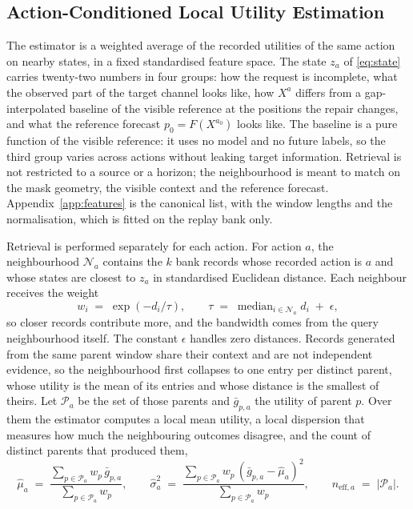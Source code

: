 \documentclass{article}
\newcommand{\calN}{\mathcal{N}}
\newcommand{\calP}{\mathcal{P}}
\begin{document}
\subsection{Action-Conditioned Local Utility Estimation}
\label{sec:method-scoring}
The estimator is a weighted average of the recorded utilities of the same action on nearby
states, in a fixed standardised feature space. The state $z_a$ of \eqref{eq:state} carries
twenty-two numbers in four groups: how the request is incomplete, what the observed part of the
target channel looks like, how $X^{a}$ differs from a gap-interpolated baseline of the visible
reference at the positions the repair changes, and what the reference forecast
$p_0 = F(X^{a_0})$ looks like. The baseline is a pure function of the visible reference: it
uses no model and no future labels, so the third group varies across actions without leaking
target information. Retrieval is not
restricted to a source or a horizon; the neighbourhood is meant to match on the mask geometry,
the visible context and the reference forecast. Appendix~\ref{app:features} is the canonical
list, with the window lengths and the normalisation, which is fitted on the replay bank only.

Retrieval is performed separately for each action. For action $a$, the neighbourhood
$\calN_a$ contains the $k$ bank records whose recorded action is $a$ and whose states are
closest to $z_a$ in standardised Euclidean distance. Each neighbour receives the weight
\begin{equation}
  w_i \;=\; \exp\!\left(-d_i / \tau\right),
  \qquad
  \tau \;=\; \operatorname{median}_{i \in \calN_a} d_i \;+\; \epsilon ,
  \label{eq:weights}
\end{equation}
so closer records contribute more, and the bandwidth comes from the query neighbourhood
itself. The constant $\epsilon$ handles zero distances. Records generated from the same
parent window share their context and are not independent evidence, so the neighbourhood
first collapses to one entry per distinct parent, whose utility is the mean of its entries and
whose distance is the smallest of theirs. Let $\calP_a$ be the set of those parents and
$\bar g_{p,a}$ the utility of parent $p$. Over them the estimator computes a local mean
utility, a local dispersion that measures how much the neighbouring outcomes disagree, and the
count of distinct parents that produced them,
\begin{equation}
  \hat\mu_a \;=\; \frac{\sum_{p \in \calP_a} w_p\, \bar g_{p,a}}{\sum_{p \in \calP_a} w_p},
  \qquad
  \hat\sigma_a^{2} \;=\; \frac{\sum_{p \in \calP_a} w_p\, (\bar g_{p,a} - \hat\mu_a)^{2}}{\sum_{p \in \calP_a} w_p},
  \qquad
  n_{\mathrm{eff},a} \;=\; \left| \calP_a \right| .
  \label{eq:local-moments}
\end{equation}
\end{document}
